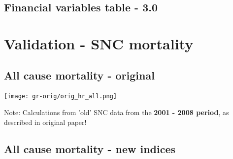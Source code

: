 \documentclass[a4paper, notitlepage, fleqn]{article} %
\begin{document}
\subsection{Financial variables table - 3.0}
\begin{stlog}\end{stlog}
\newpage
\begin{stlog}\end{stlog}
\newpage
\begin{stlog}\end{stlog}
\newpage
\section{Validation - SNC mortality}

\subsection{All cause mortality - original}

\begin{center}
\texttt{[image: gr-orig/orig\_hr\_all.png]} 
\end{center}

Note: 	Calculations from 'old' SNC data from the \textbf{2001 - 2008 period}, as described in original paper!

\subsection{All cause mortality - new indices}
\end{document}
